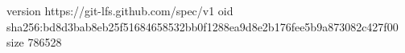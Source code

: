version https://git-lfs.github.com/spec/v1
oid sha256:bd8d3bab8eb25f51684658532bb0f1288ea9d8e2b176fee5b9a873082c427f00
size 786528
